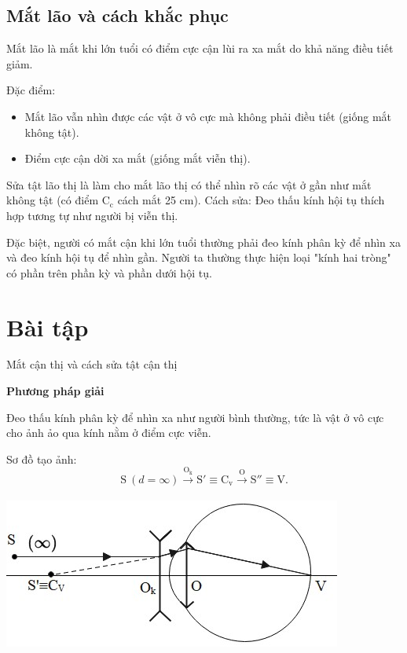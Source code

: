 \subsection{Mắt lão và cách khắc phục}
 Mắt lão là mắt khi lớn tuổi có điểm cực cận lùi ra xa mắt do khả năng điều tiết giảm.

Đặc điểm:
	\begin{itemize}
		\item Mắt lão vẫn nhìn được các vật ở vô cực mà không phải điều tiết (giống mắt không tật).
		\item Điểm cực cận dời xa mắt (giống mắt viễn thị).
	\end{itemize}

 Sửa tật lão thị là làm cho mắt lão thị có thể nhìn rõ các vật ở gần như mắt không tật (có điểm $\text{C}_\text{c}$ cách mắt 25 cm). Cách sửa: Đeo thấu kính hội tụ thích hợp tương tự như người bị viễn thị. 

Đặc biệt, người có mắt cận khi lớn tuổi thường phải đeo kính phân kỳ để nhìn xa và đeo kính hội tụ để nhìn gần. 
Người ta thường thực hiện loại "kính hai tròng" có phần trên phần kỳ và phần dưới hội tụ. 


\section{Bài tập }
\begin{dang}{Mắt cận thị và cách sửa tật cận thị}
\end{dang}
\textbf{Phương pháp giải}

Đeo thấu kính phân kỳ để nhìn xa như người bình thường, tức là vật ở vô cực cho ảnh ảo qua kính nằm ở điểm cực viễn.

Sơ đồ tạo ảnh:
$${\text{S}\ (d=\infty)}\xrightarrow[]{\text{O}_\text{k}} \text{S}'\equiv \text{C}_\text{v}  \xrightarrow[]{\text{O}}\text{S}''\equiv \text{V}.$$

\begin{center}
	\includegraphics[scale=0.8]{../figs/VN11-PH-40-L-028-3-h41.jpg}
\end{center}

